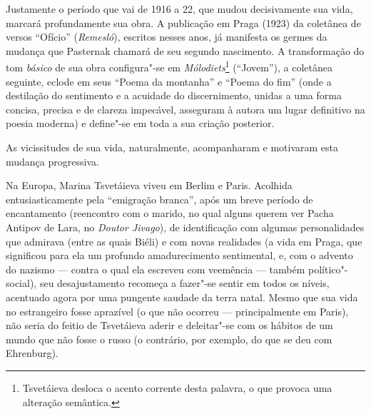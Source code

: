 Justamente o período que vai de 1916 a 22, que mudou decisivamente sua
vida, marcará profundamente sua obra. A publicação em Praga (1923) da
coletânea de versos ``Ofício'' (\emph{Remesló}), escritos nesses anos, já
manifesta os germes da mudança que Pasternak chamará de seu segundo
nascimento. A transformação do tom \emph{básico} de sua obra
configura"-se em \emph{Mólodiets}\footnote{Tsvetáieva desloca o acento
  corrente desta palavra, o que provoca uma alteração semântica.}
(``Jovem''), a coletânea seguinte, eclode em seus ``Poema da montanha''
e ``Poema do fim'' (onde a destilação do sentimento e a acuidade do
discernimento, unidas a uma forma concisa, precisa e de clareza
impecável, asseguram à autora um lugar definitivo na poesia moderna) e
define"-se em toda a sua criação posterior.

As vicissitudes de sua vida, naturalmente, acompanharam e motivaram esta
mudança progressiva.

Na Europa, Marina Tsvetáieva viveu em Berlim e Paris. Acolhida
entusiasticamente pela ``emigração branca'', após um breve período de
encantamento (reencontro com o marido, no qual alguns querem ver Pacha
Antipov de Lara, no \emph{Doutor Jivago}), de identificação com algumas
personalidades que admirava (entre as quais Biéli) e com novas
realidades (a vida em Praga, que significou para ela um profundo
amadurecimento sentimental, e, com o advento do nazismo --- contra o qual
ela escreveu com veemência --- também político"-social), seu
desajustamento recomeça a fazer"-se sentir em todos os níveis, acentuado
agora por uma pungente saudade da terra natal. Mesmo que sua vida no
estrangeiro fosse aprazível (o que não ocorreu --- principalmente em
Paris), não seria do feitio de Tsvetáieva aderir e deleitar"-se com os
hábitos de um mundo que não fosse o russo (o contrário, por exemplo, do
que se deu com Ehrenburg).

